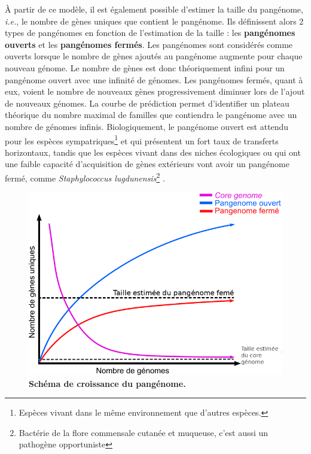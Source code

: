 À partir de ce modèle, il est également possible d'estimer la taille du pangénome, \textit{i.e.}, le nombre de gènes uniques que contient le pangénome. Ils définissent alors 2 types de pangénomes en fonction de l'estimation de la taille : les \textbf{pangénomes ouverts} et les \textbf{pangénomes fermés}. Les pangénomes sont considérés comme ouverts lorsque le nombre de gènes ajoutés au pangénome augmente pour chaque nouveau génome. Le nombre de gènes est donc théoriquement infini pour un pangénome ouvert avec une infinité de génomes. Les pangénomes fermés, quant à eux, voient le nombre de nouveaux gènes progressivement diminuer lors de l'ajout de nouveaux génomes. La courbe de prédiction permet d'identifier un plateau théorique du nombre maximal de familles que contiendra le pangénome avec un nombre de génomes infinis. Biologiquement, le pangénome ouvert est attendu pour les espèces sympatriques\footnote{Espèces vivant dans le même environnement que d'autres espèces.} et qui présentent un fort taux de transferts horizontaux, tandis que les espèces vivant dans des niches écologiques ou qui ont une faible capacité d'acquisition de gènes extérieurs vont avoir un pangénome fermé, comme \textit{Staphylococcus lugdunensis}\footnote{Bactérie de la flore commensale cutanée et muqueuse, c'est aussi un pathogène opportuniste} \cite{argemi_comparative_2018}.

\begin{figure}[htbp]
    \centering
    \includegraphics[width=0.85\linewidth]{images/panOpenClose.png}
    \caption[Schéma de croissance du pangénome]{\textbf{Schéma de croissance du pangénome.}}
    \label{fig:panOpenClose}
\end{figure}

